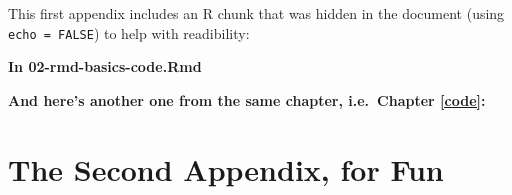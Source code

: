 \documentclass[a4paper, twoside]{templates/ociamthesis}
\newcommand*{\bibtitle}{Bibliografía}
\begin{document}
This first appendix includes an R chunk that was hidden in the document (using \texttt{echo\ =\ FALSE}) to help with readibility:

\textbf{In 02-rmd-basics-code.Rmd}

\textbf{And here's another one from the same chapter, i.e.~Chapter \ref{code}:}

\hypertarget{the-second-appendix-for-fun}{%
\chapter{The Second Appendix, for Fun}\label{the-second-appendix-for-fun}}


\setlength{\baselineskip}{0pt} %

{\renewcommand*\MakeUppercase[1]{#1}%
\printbibliography[heading=bibintoc,title={\bibtitle}]}
\end{document}
